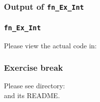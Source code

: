 
\begin{frame}[fragile]
\frametitle{Output of {\tt fn\_Ex\_Int}}

\footnotesize


\end{frame}


\begin{frame}
\frametitle{{\tt fn\_Ex\_Int}}

\footnotesize

\begin{center}\large
 Please view the actual code in: 
\end{center}

\end{frame}


\begin{frame}
\frametitle{\EmojiExercise \hmm Exercise break}

Please see directory:  \\
and its README.

\end{frame}







